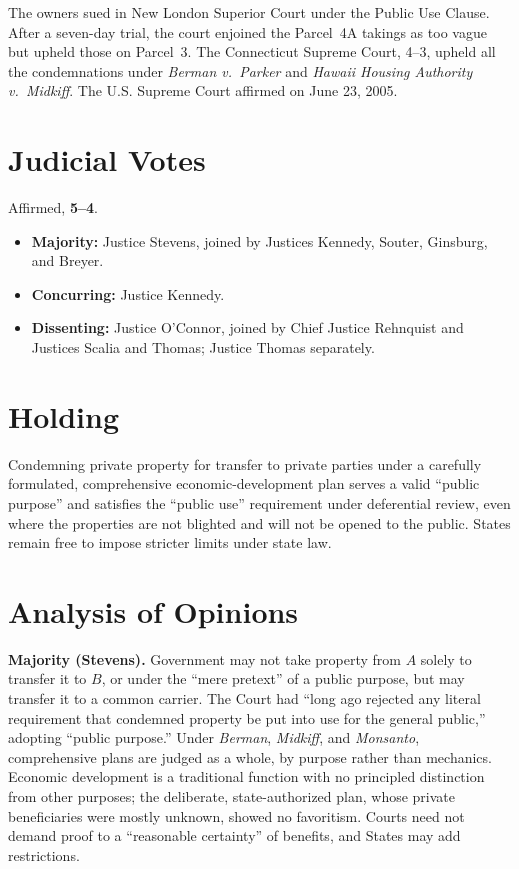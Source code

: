 \documentclass[12pt]{article}
\begin{document}
The owners sued in New London Superior Court under the Public Use Clause. After a seven-day trial, the court enjoined the Parcel~4A takings as too vague but upheld those on Parcel~3. The Connecticut Supreme Court, 4--3, upheld all the condemnations under \textit{Berman v.\ Parker} and \textit{Hawaii Housing Authority v.\ Midkiff}. The U.S. Supreme Court affirmed on June 23, 2005.

\section{Judicial Votes}

Affirmed, \textbf{5--4}.
\begin{itemize}
\item \textbf{Majority:} Justice Stevens, joined by Justices Kennedy, Souter, Ginsburg, and Breyer.
\item \textbf{Concurring:} Justice Kennedy.
\item \textbf{Dissenting:} Justice O'Connor, joined by Chief Justice Rehnquist and Justices Scalia and Thomas; Justice Thomas separately.
\end{itemize}

\section{Holding}

Condemning private property for transfer to private parties under a carefully formulated, comprehensive economic-development plan serves a valid ``public purpose'' and satisfies the ``public use'' requirement under deferential review, even where the properties are not blighted and will not be opened to the public. States remain free to impose stricter limits under state law.

\section{Analysis of Opinions}

\textbf{Majority (Stevens).} Government may not take property from $A$ solely to transfer it to $B$, or under the ``mere pretext'' of a public purpose, but may transfer it to a common carrier. The Court had ``long ago rejected any literal requirement that condemned property be put into use for the general public,'' adopting ``public purpose.'' Under \textit{Berman}, \textit{Midkiff}, and \textit{Monsanto}, comprehensive plans are judged as a whole, by purpose rather than mechanics. Economic development is a traditional function with no principled distinction from other purposes; the deliberate, state-authorized plan, whose private beneficiaries were mostly unknown, showed no favoritism. Courts need not demand proof to a ``reasonable certainty'' of benefits, and States may add restrictions.
\end{document}
